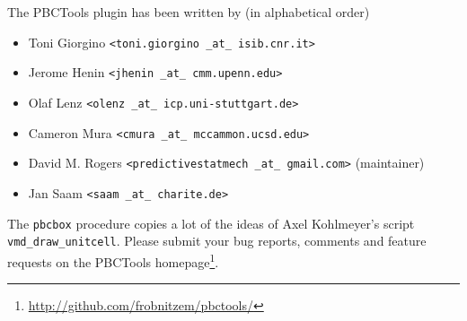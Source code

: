 \documentclass[a4paper, DIV12]{scrartcl}
\newcommand{\pbctools}{PBCTools\xspace}
\begin{document}
The \pbctools plugin has been written by (in alphabetical order)
\begin{itemize}
\item Toni Giorgino \texttt{<toni.giorgino \_at\_ isib.cnr.it>}
\item Jerome Henin \texttt{<jhenin \_at\_ cmm.upenn.edu>}
\item Olaf Lenz \texttt{<olenz \_at\_ icp.uni-stuttgart.de>}
\item Cameron Mura \texttt{<cmura \_at\_ mccammon.ucsd.edu>}
\item David M. Rogers \texttt{<predictivestatmech \_at\_ gmail.com>} (maintainer)
\item Jan Saam \texttt{<saam \_at\_ charite.de>}
\end{itemize}
The \texttt{pbcbox} procedure copies a lot of the ideas of Axel
Kohlmeyer's script \texttt{vmd\_draw\_unitcell}.
Please submit your bug reports, comments and feature requests on the
\pbctools
homepage\footnote{\url{http://github.com/frobnitzem/pbctools/}}.
\end{document}
